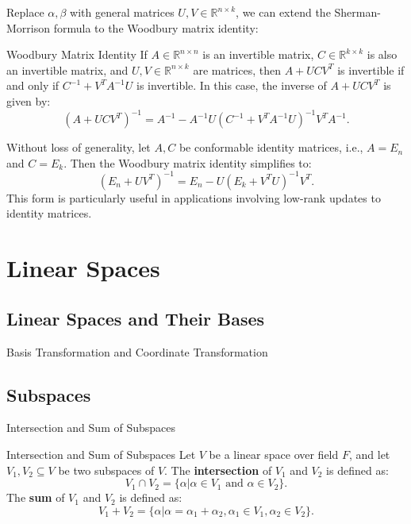 \documentclass[11pt]{../../TexTemplate/elegantbook} %
\begin{document}
\vspace{0.7cm}
Replace \( \alpha, \beta\) with general matrices \( U, V \in \mathbb{R}^{n\times k} \),
we can extend the Sherman-Morrison formula to the Woodbury matrix identity:
\begin{theorem}{Woodbury Matrix Identity}
    If \( A\in \mathbb{R}^{n\times n} \) is an invertible matrix, 
    \(C\in \mathbb{R}^{k\times k}\) is also an invertible matrix, 
    and \( U, V\in \mathbb{R}^{n\times k} \) are matrices, 
    then \( A + UCV^T \) is invertible if and only if \( C^{-1} + V^T A^{-1} U \) is invertible. 
    In this case, the inverse of \( A + UCV^T \) is given by:
    \[
    \left(A + UCV^T\right)^{-1} = A^{-1} - A^{-1} U \left(C^{-1} + V^T A^{-1} U\right)^{-1} V^T A^{-1}.
    \]
\end{theorem}

Without loss of generality, let \( A, C \) be conformable identity matrices,
i.e., \( A = E_n \) and \( C = E_k \). Then the Woodbury matrix identity simplifies to:
\[
\left(E_n + UV^T\right)^{-1} = E_n - U \left(E_k + V^T U\right)^{-1} V^T.
\]
This form is particularly useful in applications involving low-rank updates to identity matrices.


\chapter{Linear Spaces}
\section{Linear Spaces and Their Bases}

\begin{leftbarTitle}{Basis Transformation and Coordinate Transformation}\end{leftbarTitle}


\section{Subspaces}
\begin{leftbarTitle}{Intersection and Sum of Subspaces}\end{leftbarTitle}
\begin{definition}{Intersection and Sum of Subspaces}
    Let \( V \) be a linear space over field \( F \), 
    and let \( V_1, V_2 \subseteq V \) be two subspaces of \( V \).
    The \textbf{intersection} of \( V_1 \) and \( V_2 \) is defined as:
    \[
    V_1 \cap V_2 = \{ \alpha | \alpha \in V_1 \text{ and } \alpha \in V_2 \}.
    \]
    The \textbf{sum} of \( V_1 \) and \( V_2 \) is defined as:
    \[
    V_1 + V_2 = \{ \alpha | \alpha = \alpha_1 + \alpha_2, 
    \alpha_1 \in V_1, \alpha_2 \in V_2 \}.
    \]
\end{definition}
\end{document}
